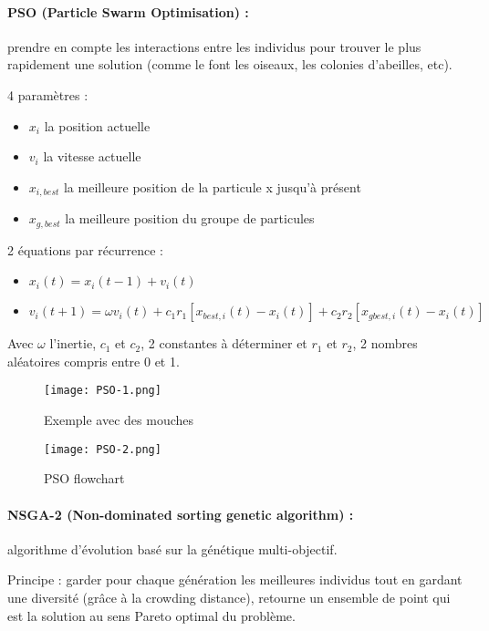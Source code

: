 \paragraph{PSO (Particle Swarm Optimisation) :} prendre en compte les interactions entre les individus pour trouver le plus rapidement une solution (comme le font les oiseaux,  les colonies d’abeilles, etc).

4 paramètres :

\begin{itemize}
    \item $x_i$ la position actuelle
    \item $v_i$ la vitesse actuelle
    \item $x_{i,best}$ la meilleure position de la particule x jusqu’à présent
    \item $x_{g,best}$ la meilleure position du groupe de particules 
\end{itemize}

2 équations par récurrence :

\begin{itemize}
    \item $x_i(t)=x_i(t-1)+v_i(t)$
    \item $v_i(t+1)= \omega v_i(t) +c_1r_1[x_{best,i}(t)-x_i(t)]+c_2r_2[x_{gbest,i}(t)-x_i(t)]$
\end{itemize}

Avec $\omega$ l’inertie, $c_1$ et $c_2$, 2 constantes à déterminer et $r_1$ et $r_2$, 2 nombres aléatoires compris entre 0 et 1.

\begin{figure}[H]
    \centering
    \texttt{[image: PSO-1.png]}
    \caption{Exemple avec des mouches}
\end{figure}

\begin{figure}[H]
    \centering
    \texttt{[image: PSO-2.png]}
    \caption{PSO flowchart}
\end{figure}

\paragraph{NSGA-2 (Non-dominated sorting genetic algorithm) :} algorithme d’évolution basé sur la génétique multi-objectif.

Principe : garder pour chaque génération les meilleures individus tout en gardant une diversité (grâce à la crowding distance), retourne un ensemble de point qui est la solution au sens Pareto optimal du problème.

